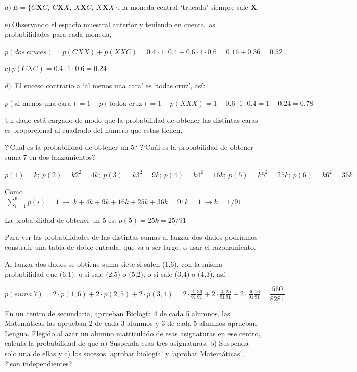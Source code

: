 $a)\ E=\{C\boldsymbol{X}C,\ C\boldsymbol{X}X,\ X\boldsymbol{X}C,\ X\boldsymbol{X}X\}$, la moneda central `trucada' siempre sale $\boldsymbol{X}$.

$b) \ $Observando el espacio muestral anterior y teniendo en cuenta las probabilidades para cada moneda,

$p(dos \ cruces)=p(CXX)+p(XXC)=0.4\cdot 1 \cdot 0.4+ 0.6\cdot 1 \cdot 0.6=0.16+0.36=0.52$

$c)\ p(CXC)=0.4\cdot 1 \cdot 0.6=0.24$

$d)\ $ El suceso contrario a `al menos una cara' es `todas cruz', así:

$p(\text{al menos una cara})=1-p(\text{todoa cruz})=1-p(XXX)=1-0.6\cdot 1 \cdot 0.4=1-0.24=0.78$


\vspace{3mm}
\begin{ejemplo}
\begin{ejer}
Un dado está cargado de modo que la probabilidad de obtener las distintas caras es proporcional al cuadrado del número que estas tienen.

?`Cuál es la probabilidad de obtener un 5? ?`Cuál es la probabilidad de obtener suma 7 en dos lanzamientos?	
\end{ejer}
\end{ejemplo}
\begin{small}
$p(1)=k;\ p(2)=k2^2=4k;\ p(3)=k3^2=9k;\ p(4)=k4^2=16k; \ p(5)=k5^2=25k;\ p(6)=k6^2=36k$ \end{small}

Como $\ \displaystyle \sum_{i=1}^6p(i)=1 \ \to \ k+4k+9k+16k+25k+36k=91k=1 \ \to k=1/91$

La probabilidad de obtener un 5 es: $p(5)=25k=25/91$

Para ver las probabilidades de las distintas sumas al lanzar dos dados podríamos construir una tabla de doble entrada, que va a ser largo, o usar el razonamiento.

Al lanzar dos dados se obtiene suma siete si salen (1,6), con la misma probabilidad que (6,1); o si sale (2,5) o (5,2); o si sale (3,4) o (4,3), así:

$p(suma\ 7)=2\cdot p(1,6)+ 2\cdot p(2,5)+2\cdot p(3,4)=
2\cdot \frac{1}{91}\frac{36}{91}+2\cdot \frac{4}{91} \frac{25}{91}+2\cdot \frac{9}{91} \frac{16}{91}= \dfrac{560}{8281}$

\vspace{3mm}
\begin{ejemplo}
\begin{ejer}
En un centro de secundaria, aprueban Biología 4 de cada 5 alumnos, las Matemáticas las aprueban 2 de cada 3 alumnos y 3 de cada 5 alumnos aprueban Lengua. Elegido al azar un alumno matriculado de esas asignaturas en ese centro, calcula la probabilidad de que a) Suspenda esas tres asignaturas, b) Suspenda solo una de ellas y c) los sucesos `aprobar biología' y `aprobar Matemáticas', ?`son independientes?.	
\end{ejer}
\end{ejemplo}

